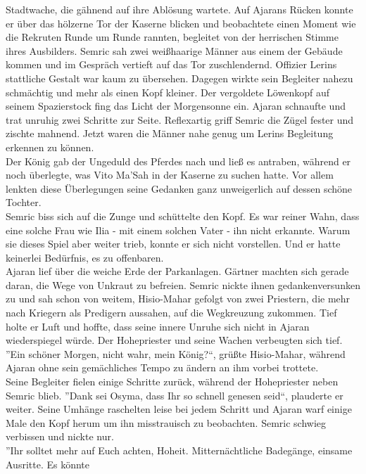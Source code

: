 Stadtwache, die gähnend auf ihre Ablösung wartete. Auf Ajarans Rücken konnte er über das hölzerne 
Tor der Kaserne blicken und beobachtete einen Moment wie die Rekruten Runde um Runde rannten, 
begleitet von der herrischen Stimme ihres Ausbilders. Semric sah zwei weißhaarige Männer aus einem 
der Gebäude kommen und im Gespräch vertieft auf das Tor zuschlendernd. Offizier Lerins stattliche 
Gestalt war kaum zu übersehen. Dagegen wirkte sein Begleiter nahezu schmächtig und mehr als einen 
Kopf kleiner. Der vergoldete Löwenkopf auf seinem Spazierstock fing das Licht der Morgensonne ein. 
Ajaran schnaufte und trat unruhig zwei Schritte zur Seite. Reflexartig griff Semric die Zügel 
fester und zischte mahnend. Jetzt waren die Männer nahe genug um Lerins Begleitung erkennen zu 
können.\\
Der König gab der Ungeduld des Pferdes nach und ließ es antraben, während er noch überlegte, was 
Vito Ma'Sah in der Kaserne zu suchen hatte. Vor allem lenkten diese Überlegungen seine Gedanken 
ganz unweigerlich auf dessen schöne Tochter.\\
Semric biss sich auf die Zunge und schüttelte den Kopf. Es war reiner Wahn, dass eine solche Frau 
wie Ilia - mit einem solchen Vater - ihn nicht erkannte. Warum sie dieses Spiel aber weiter trieb, 
konnte er sich nicht vorstellen. Und er hatte keinerlei Bedürfnis, es zu offenbaren.\\
Ajaran lief über die weiche Erde der Parkanlagen. Gärtner machten sich gerade daran, die Wege von 
Unkraut zu befreien. Semric nickte ihnen gedankenversunken zu und sah schon von weitem, Hisio-Mahar 
gefolgt von zwei Priestern, die mehr nach Kriegern als Predigern aussahen, auf die Wegkreuzung 
zukommen. Tief holte er Luft und hoffte, dass seine innere Unruhe sich nicht in Ajaran 
wiederspiegel würde. Der Hohepriester und seine Wachen verbeugten sich tief.\\
''Ein schöner Morgen, nicht wahr, mein König?``, grüßte Hisio-Mahar, während Ajaran ohne sein 
gemächliches Tempo zu ändern an ihm vorbei trottete.\\
Seine Begleiter fielen einige Schritte zurück, während der Hohepriester neben Semric blieb. ''Dank 
sei Osyma, dass Ihr so schnell genesen seid``, plauderte er weiter. Seine Umhänge raschelten leise 
bei jedem Schritt und Ajaran warf einige Male den Kopf herum um ihn misstrauisch zu beobachten. 
Semric schwieg verbissen und nickte nur.\\
''Ihr solltet mehr auf Euch achten, Hoheit. Mitternächtliche Badegänge, einsame Ausritte. Es könnte 
